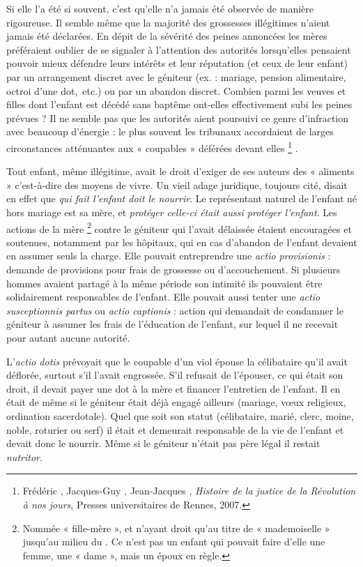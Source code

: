  Si elle l'a été si souvent, c'est qu'elle n'a jamais été observée de manière rigoureuse. Il semble même que la majorité des grossesses illégitimes n'aient jamais été déclarées. En dépit de la sévérité des peines annoncées les mères préféraient oublier de se signaler à l'attention des autorités lorsqu'elles pensaient pouvoir mieux défendre leurs intérêts et leur réputation (et ceux de leur enfant) par un arrangement discret avec le géniteur (ex. : mariage, pension alimentaire, octroi d'une dot,~etc.) ou par un abandon discret. Combien parmi les veuves et filles dont l'enfant est décédé sans baptême ont-elles effectivement subi les peines prévues ? Il ne semble pas que les autorités aient poursuivi ce genre d'infraction avec beaucoup d'énergie : le plus souvent les tribunaux accordaient de larges circonstances atténuantes aux « coupables » déférées devant elles%
\footnote{Frédéric , Jacques-Guy , Jean-Jacques , \emph{Histoire de la justice de la Révolution à nos jours}, Presses universitaires de Rennes, 2007.}%
. 

 Tout enfant, même illégitime, avait le droit d'exiger de ses auteurs des « aliments » c'est-à-dire des moyens de vivre. Un vieil adage juridique, toujours cité, disait en effet que \emph{qui fait l'enfant doit le nourrir}. Le représentant naturel de l'enfant né hors mariage est sa mère, et \emph{protéger celle-ci était aussi protéger l'enfant}. Les actions de la mère%
\footnote{Nommée « fille-mère », et n'ayant droit qu'au titre de « mademoiselle » jusqu'au milieu du . Ce n'est pas un enfant qui pouvait faire d'elle une femme, une « dame », mais un époux en règle.} 
contre le géniteur qui l'avait délaissée étaient encouragées et soutenues, notamment par les hôpitaux, qui en cas d'abandon de l'enfant devaient en assumer seuls la charge. Elle pouvait entreprendre une \emph{actio provisionis} : demande de provisions pour frais de grossesse ou d'accouchement. Si plusieurs hommes avaient partagé à la même période son intimité ils pouvaient être solidairement responsables de l'enfant. Elle pouvait aussi tenter une \emph{actio susceptionnis partus} ou \emph{actio captionis} : action qui demandait de condamner le géniteur à assumer les frais de l'éducation de l'enfant, sur lequel il ne recevait pour autant aucune autorité. 

 L'\emph{actio dotis} prévoyait que le coupable d'un viol épouse la célibataire qu'il avait déflorée, surtout s'il l'avait engrossée. S'il refusait de l'épouser, ce qui était son droit, il devait payer une dot à la mère et financer l'entretien de l'enfant. Il en était de même si le géniteur était déjà engagé ailleurs (mariage, vœux religieux, ordination sacerdotale). Quel que soit son statut (célibataire, marié, clerc, moine, noble, roturier ou serf) il était et demeurait responsable de la vie de l'enfant et devait donc le nourrir. Même si le géniteur n'était pas père légal il restait \emph{nutritor}.

